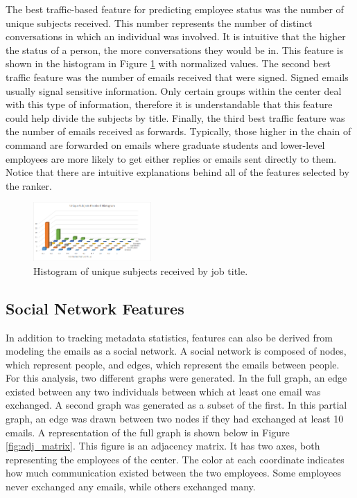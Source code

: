 \documentclass{article}
\begin{document}
\par
The best traffic-based feature for predicting employee status was the number of unique subjects received.  This number represents the number of distinct conversations in which an individual was involved.  It is intuitive that the higher the status of a person, the more conversations they would be in.  This feature is shown in the histogram in Figure \ref{fig:traffic_ex_hist} with normalized values.  The second best traffic feature was the number of emails received that were signed.  Signed emails usually signal sensitive information.  Only certain groups within the center deal with this type of information, therefore it is understandable that this feature could help divide the subjects by title.  Finally, the third best traffic feature was the number of emails received as forwards.  Typically, those higher in the chain of command are forwarded on emails where graduate students and lower-level employees are more likely to get either replies or emails sent directly to them.  Notice that there are intuitive explanations behind all of the features selected by the ranker.


\begin{figure}[H]
    \centering
        \includegraphics[width=0.4\textwidth]{Unique_subjects_rec_hist}
        \caption{Histogram of unique subjects received by job title.}
        \label{fig:traffic_ex_hist}
\end{figure}


\subsection{Social Network Features}
In addition to tracking metadata statistics, features can also be derived from modeling the emails as a social network.  A social network is composed of nodes, which represent people, and edges, which represent the emails between people.  For this analysis, two different graphs were generated.  In the full graph, an edge existed between any two individuals between which at least one email was exchanged.  A second graph was generated as a subset of the first.  In this partial graph, an edge was drawn between two nodes if they had exchanged at least 10 emails.  A representation of the full graph is shown below in Figure \ref{fig:adj_matrix}.  This figure is an adjacency matrix.  It has two axes, both representing the employees of the center.  The color at each coordinate indicates how much communication existed between the two employees.  Some employees never exchanged any emails, while others exchanged many.
\end{document}
